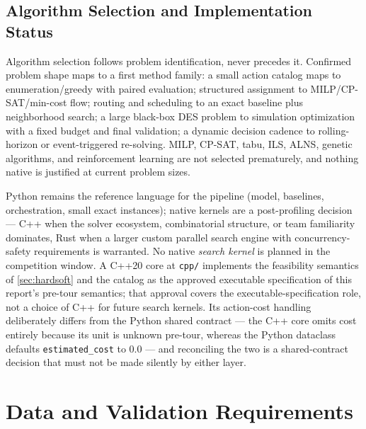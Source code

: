 \documentclass[11pt,a4paper]{article}
\begin{document}
\subsection{Algorithm Selection and Implementation Status}\label{sec:algo}

Algorithm selection follows problem identification, never precedes it.
Confirmed problem shape maps to a first method family: a small action
catalog maps to enumeration/greedy with paired evaluation; structured
assignment to MILP/CP-SAT/min-cost flow; routing and scheduling to an exact
baseline plus neighborhood search; a large black-box DES problem to
simulation optimization with a fixed budget and final validation; a dynamic
decision cadence to rolling-horizon or event-triggered re-solving. MILP,
CP-SAT, tabu, ILS, ALNS, genetic algorithms, and reinforcement learning are
not selected prematurely, and nothing native is justified at current problem
sizes.

Python remains the reference language for the pipeline (model, baselines,
orchestration, small exact instances); native kernels are a post-profiling
decision --- C++ when the solver ecosystem, combinatorial structure, or team
familiarity dominates, Rust when a larger custom parallel search engine with
concurrency-safety requirements is warranted. No native \emph{search kernel}
is planned in the competition window. A C++20 core at \texttt{cpp/}
implements the feasibility semantics of \cref{sec:hardsoft} and the catalog
as the approved executable specification of this report's pre-tour
semantics; that approval covers the executable-specification role, not a
choice of C++ for future search kernels. Its action-cost handling
deliberately differs from the Python shared contract --- the C++ core omits
cost entirely because its unit is unknown pre-tour, whereas the Python
dataclass defaults \texttt{estimated\_cost} to 0.0 --- and reconciling the
two is a shared-contract decision that must not be made silently by either
layer.

\section{Data and Validation Requirements}\label{sec:data}
\end{document}
